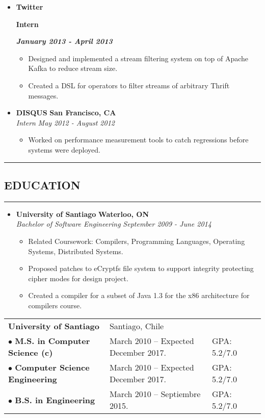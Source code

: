 \documentclass[10pt,letterpaper]{article}
\newcommand\textbox[1]{%
  \parbox{.333\textwidth}{#1}%
}
\newcommand{\sectionTitle}[1]{
  \hrule
  \vspace{-1.0em} 
  \subsection*{\uppercase{\textbf{#1}}}
  \vspace{-0.3em}
    \hrule
    \vspace{0.5em}  
}
\newcommand{\titleExperienceWithoutLocation}[3]{
  \item[]
  {
    \textbox{\textbf{#1}\hfill}\textbox{\hfil \textbf{#2}\hfil}\hfill \textbf{\emph{#3}}
  }
}
\newcommand{\titleExperienceWithLocation}[4]{
  \item[]
  {
    \textbf{#1} \hfill
    \textbf{#2}
  }
  \\{\emph{#3} \hfill \emph{#4}}
}
\begin{document}
\begin{itemize}[leftmargin=*]
    \titleExperienceWithoutLocation{Twitter}{Intern}{January 2013 - April 2013}
    \begin{itemize}[label=\textbullet]
      \itemsep0em
      \item Designed and implemented a stream filtering system on top of Apache
      Kafka to reduce stream size.
      \item Created a DSL for operators to filter streams of arbitrary Thrift
      messages.
    \end{itemize}
    
    \titleExperienceWithLocation{DISQUS}{San Francisco, CA}{Intern}{May 2012 - August 2012}
    \begin{itemize}[label=\textbullet]
      \itemsep0em
      \item Worked on performance measurement tools to catch regressions before
      systems were deployed.
    \end{itemize}
    
    
  
  \end{itemize}
  
  
  \sectionTitle{Education}  
  \begin{itemize}[leftmargin=*]
    \parskip=-0.5em
    
    \item[]
    {\textbf{University of Santiago} \hfill
      \textbf{Waterloo, ON}
    }
    \\
    {\emph{Bachelor of Software Engineering} \hfill
      \emph{September 2009 - June 2014}}
    
    \begin{itemize}[label=\textbullet]
      \item Related Coursework: Compilers, Programming Languages, Operating
      Systems, Distributed Systems.
      \item Proposed patches to eCryptfs file system to support
      integrity protecting cipher modes for design project.
      \item Created a compiler for a subset of Java 1.3 for the
      x86 architecture for compilers course.
    \end{itemize}
  \end{itemize}
  
  \begin{tabular}{lllc} 
    \textbf{University of Santiago}&Santiago, Chile& & \\
    $\bullet$ \textbf{M.S. in Computer Science (c)}& March 2010 – Expected December 2017. & GPA: 5.2/7.0 & \\
    $\bullet$ \textbf{Computer Science Engineering} & March 2010 – Expected December 2017. & GPA: 5.2/7.0 & \\
    $\bullet$ \textbf{B.S. in Engineering} & March 2010 – Septiembre 2015. & GPA: 5.2/7.0  &\\
  \end{tabular}
  
\end{document}
